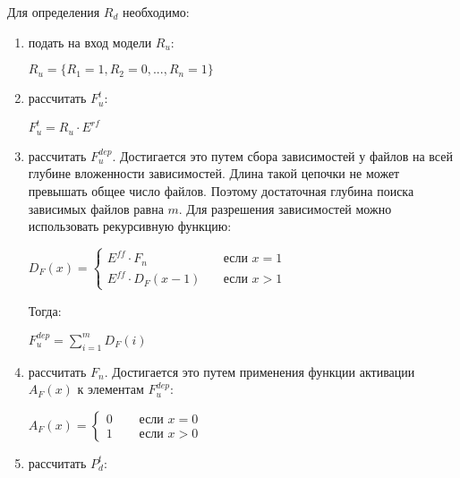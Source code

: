 \documentclass{article}
\begin{document}
  Для определения $R_{d}$ необходимо:
  \begin{enumerate}
    \item подать на вход модели $R_{u}$:

    \begin{center}
      $R_{u} = \{R_{1} = 1, R_{2} = 0, ..., R_{n} = 1\}$
    \end{center}

    \item рассчитать $F^{t}_{u}$:

    \begin{center}
      $F^{t}_{u} = R_{u} \cdot E^{rf}$
    \end{center}

    \item рассчитать $F^{dep}_{u}$. Достигается это путем сбора зависимостей у файлов на всей глубине вложенности зависимостей. Длина такой цепочки не может превышать общее число файлов. Поэтому достаточная глубина поиска зависимых файлов равна $m$. Для разрешения зависимостей можно использовать рекурсивную функцию:
    
    \begin{center}
    $
    D_{F}(x) = 
      \begin{cases}
        E^{ff} \cdot F_{n} & \quad \text{если } x = 1 \\
        E^{ff} \cdot D_{F}(x - 1) & \quad \text{если } x > 1
      \end{cases}
    $
    \end{center}

    Тогда:

    \begin{center}
      $F^{dep}_{u} = \displaystyle\sum^m_{i = 1}D_{F}(i)$
    \end{center}

    \item рассчитать $F_n$. Достигается это путем применения функции активации $A_{F}(x)$ к элементам $F^{dep}_{u}$:

    \begin{center}
      $
      A_{F}(x) = 
        \begin{cases}
          0 & \quad \text{ если } x = 0 \\
          1 & \quad \text{ если } x > 0
        \end{cases}
      $
    \end{center}

    \item рассчитать $P^{t}_{d}$:


\end{enumerate}
\end{document}
